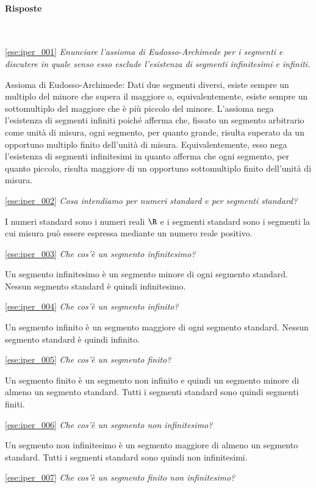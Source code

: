 \paragraph{Risposte}
~

\ref{ese:iper_001} 
\emph{Enunciare l'assioma di Eudosso-Archimede per i segmenti e 
discutere in quale senso esso esclude l'esistenza di segmenti infinitesimi e 
infiniti.}

Assioma di Eudosso-Archimede: Dati due segmenti diversi, esiste sempre un 
multiplo del minore che supera il maggiore o, equivalentemente, esiste sempre 
un sottomultiplo del maggiore che è più piccolo del minore.
L'assioma nega l'esistenza di segmenti infiniti poiché afferma che, fissato un 
segmento arbitrario come unità di misura, ogni segmento, per quanto grande, 
risulta superato da un opportuno multiplo finito dell'unità di misura. 
Equivalentemente, esso nega l'esistenza di segmenti infinitesimi in quanto 
afferma che ogni segmento, per quanto piccolo, risulta maggiore di un opportuno 
sottomultiplo finito dell'unità di misura.

\ref{ese:iper_002} 
\noindent\emph{Cosa intendiamo per numeri standard e per segmenti standard?}

I numeri standard sono i numeri reali \(\R\) e i segmenti standard sono i 
segmenti la cui misura può essere espressa mediante un numero reale positivo.

\ref{ese:iper_003} 
\emph{Che cos'è un segmento infinitesimo?}

Un segmento infinitesimo è un segmento minore di ogni segmento standard. 
Nessun segmento standard è quindi infinitesimo.

\ref{ese:iper_004} 
\emph{Che cos'è un segmento infinito?}

Un segmento infinito è un segmento maggiore di ogni segmento standard. 
Nessun segmento standard è quindi infinito.

\ref{ese:iper_005} 
\emph{Che cos'è un segmento finito?}

Un segmento finito è un segmento non infinito e quindi un segmento minore di 
almeno un segmento standard. 
Tutti i segmenti standard sono quindi segmenti finiti.

\ref{ese:iper_006} 
\emph{Che cos'è un segmento non infinitesimo?}

Un segmento non infinitesimo è un segmento maggiore di almeno un segmento 
standard. Tutti i segmenti standard sono quindi non infinitesimi.

\ref{ese:iper_007} 
\emph{Che cos'è un segmento finito non infinitesimo?}


